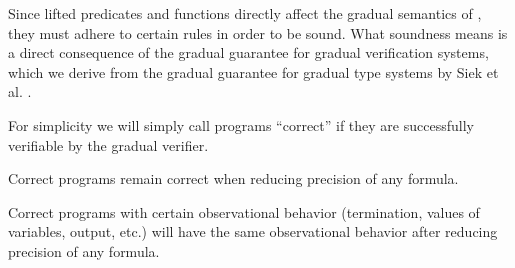 Since lifted predicates and functions directly affect the gradual semantics of \gvl, they must adhere to certain rules in order to be sound.
What soundness means is a direct consequence of the gradual guarantee for gradual verification systems, which we derive from the gradual guarantee for gradual type systems by Siek et al. \cite{siek2015refined}.

For simplicity we will simply call programs “correct” if they are successfully verifiable by the gradual verifier.

\begin{definition}
    \label{grad-guarantee-static}
    Correct programs remain correct when reducing precision of any formula.
\end{definition}

\begin{definition}
    \label{grad-guarantee-dynamic}
    Correct programs with certain observational behavior (termination, values of variables, output, etc.) will have the same observational behavior after reducing precision of any formula.
\end{definition}

\begin{comment}
With the notion of precision, we can give a formal definition of the gradual guarantee (TODO: ref) that we are aiming to satisfy.




PROBABLY UNNECESSARY:\\
Because of its generality, we will pursue the approach introduced in section \ref{ssec:wildcard-with-upper} for the remainder of this chapter.
As concretization we chose the semantic version, as it is more flexible than the syntactic one in practice.
For reference, the full definitions:
\begin{align*} 
&\text{Syntax:}\\
&\grad{\phi} ::= \phi ~|~ \withqmGen{\phi}\\
\\
&\text{Concretization:}\\
&\gamma(\phi) = \{~ \phi ~\}     \quad\quad \forall \phi \in \setFormulaA\\
&\gamma(\withqmGen{\phi}) = \{~ \phi' \in \setFormulaA ~|~ \phiImplies{\phi'}{\phi} ~\}\\
&\gamma(\grad{\phi}) = \emptyset    \quad\textit{otherwise}
\end{align*}
\end{comment}

